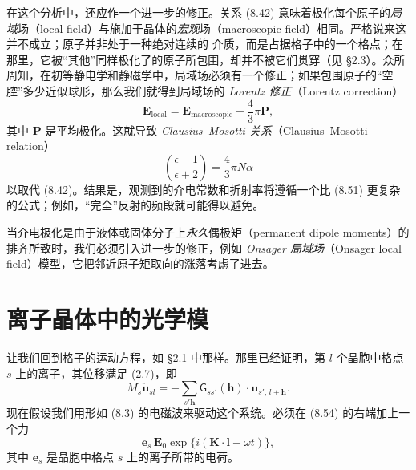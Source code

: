 在这个分析中，还应作一个进一步的修正。关系 (8.42) 意味着极化每个原子的\emph{局域}场（local field）与施加于晶体的\emph{宏观}场（macroscopic field）相同。严格说来这并不成立；原子并非处于一种绝对连续的
介质，而是占据格子中的一个格点；在那里，它被“其他”同样极化了的原子所包围，却并不被它们贯穿（见 §2.3）。众所周知，在初等静电学和静磁学中，局域场必须有一个修正；如果包围原子的“空腔”多少近似球形，那么我们就得到局域场的 \emph{Lorentz 修正}（Lorentz correction）
\begin{equation*}
\mathbf{E}_{\mathrm{local}} = \mathbf{E}_{\mathrm{macroscopic}} + \frac{4}{3}\pi\mathbf{P},\tag{8.52}
\end{equation*}
其中 $\mathbf{P}$ 是平均极化。这就导致 \emph{Clausius–Mosotti 关系}（Clausius–Mosotti relation）
\begin{equation*}
\left(\frac{\epsilon-1}{\epsilon+2}\right) = \frac{4}{3}\pi N\alpha\tag{8.53}
\end{equation*}
以取代 (8.42)。结果是，观测到的介电常数和折射率将遵循一个比 (8.51) 更复杂的公式；例如，“完全”反射的频段就可能得以避免。

当介电极化是由于液体或固体分子上\emph{永久}偶极矩（permanent dipole moments）的排齐所致时，我们必须引入进一步的修正，例如 \emph{Onsager 局域场}（Onsager local field）模型，它把邻近原子矩取向的涨落考虑了进去。

\section{离子晶体中的光学模}

让我们回到格子的运动方程，如 §2.1 中那样。那里已经证明，第 $l$ 个晶胞中格点 $s$ 上的离子，其位移满足 (2.7)，即
\begin{equation*}
M_s \ddot{\mathbf{u}}_{sl} = -\sum_{s'\boldsymbol{h}} \mathsf{G}_{ss'}(\boldsymbol{h})\cdot\mathbf{u}_{s',\,l+\boldsymbol{h}}.\tag{8.54}
\end{equation*}
现在假设我们用形如 (8.3) 的电磁波来驱动这个系统。必须在 (8.54) 的右端加上一个力
\begin{equation*}
\boldsymbol{e}_s\,\mathbf{E}_0\exp\{i(\mathbf{K}\cdot\boldsymbol{l}-\omega t)\},\tag{8.55}
\end{equation*}
其中 $\boldsymbol{e}_s$ 是晶胞中格点 $s$ 上的离子所带的电荷。

